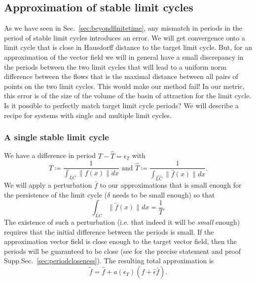 \documentclass{article}
\theoremstyle{definition}
\theoremstyle{remark}
\newcounter{ct}
\begin{document}
\subsection{Approximation of stable limit cycles}
As we have seen in Sec.~\ref{sec:beyondfinitetime}, any mismatch in periods in the period of stable limit cycles introduces an error.
We will get convergence onto a limit cycle that is close in Hausdorff distance to the target limit cycle. %
But, for an approximation of the vector field we will in general have a small discrepancy in the periods between the two limit cycles that will lead to a uniform norm difference between the flows that is the maximal distance between all pairs of points on the two limit cycles.
This would make our method fail!
In our metric, this error is of the size of the volume of the basin of attraction for the limit cycle.
Is it possible to perfectly match target limit cycle periods?
We will describe a recipe for systems with single and multiple limit cycles.


\subsubsection{A single stable limit cycle}
We have a difference in period $T-\hat T = \epsilon_T$
with \[T\coloneqq\frac{1}{\int_{LC}\|f(x)\|dx} \text{ and } \hat T\coloneqq\frac{1}{\int_{\hat{LC}}\|\hat f(x)\|dx}.\]
%
We will apply a perturbation $\bar{f}$ to our approximations that is small enough for the persistence of the limit cycle ($\delta$ needs to be small enough) 
so that 
\[\int_{\tilde{LC}}\|\tilde{f}(x)\| dx = \frac{1}{T}. 	\]%
The existence of such a perturbation (i.e. that indeed it will be \emph{small} enough) requires that the initial difference between the periods is small.
If the approximation vector field is close enough to the target vector field, then the periods will be guaranteed to be close (see for the precise statement and proof Supp.Sec.~\ref{sec:periodcloseness}).
The resulting total approximation is \[\tilde{f}=%
 \hat{f} + a(\epsilon_T)(\hat{f} + \hat{\epsilon}\bar{f}).\]
\end{document}
